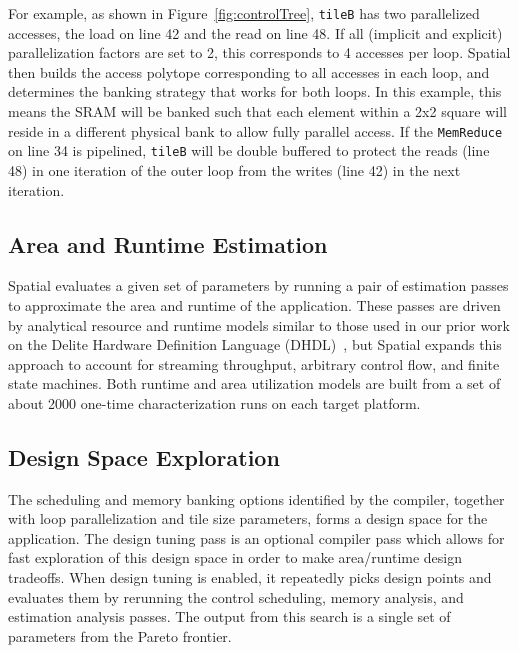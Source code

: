 {For example, as shown in Figure~\ref{fig:controlTree}, \texttt{\small{tileB}} has two parallelized accesses, the load on line 42 and the read on line 48. If all (implicit and explicit) parallelization factors are set to 2, this corresponds to 4 accesses per loop. Spatial then builds the access polytope corresponding to all accesses in each loop, and determines the banking strategy that works for both loops. In this example, this means the SRAM will be banked such that each element within a 2x2 square will reside
in a different physical bank to allow fully parallel access. If the \texttt{\small{MemReduce}} on line 34 is pipelined, \texttt{\small{tileB}} will be double buffered to protect the reads (line 48) in one iteration of the outer loop
from the writes (line 42) in the next iteration.


\subsection{Area and Runtime Estimation}
\label{estimate}
Spatial evaluates a given set of parameters by running a pair of estimation passes to approximate the area and runtime  of the application.
These passes are driven by analytical resource and runtime models similar to those used in our prior work on the Delite Hardware Definition Language (DHDL)~\cite{dhdl}, but Spatial expands this approach to account for streaming throughput, arbitrary control flow, and finite state machines. Both runtime and area utilization models are built from a set of about 2000 one-time characterization runs on each target platform.



\subsection{Design Space Exploration}
\label{dse}
The scheduling and memory banking options identified by the compiler, together with loop parallelization and tile size parameters, forms a design space for the application. 
The design tuning pass is an optional compiler pass which allows for fast exploration of this design space in order to make area/runtime design tradeoffs.
When design tuning is enabled, it repeatedly picks design points and evaluates them by rerunning the control scheduling, memory analysis, and estimation analysis passes. The output from this search is a single set of parameters from the Pareto frontier.


}
